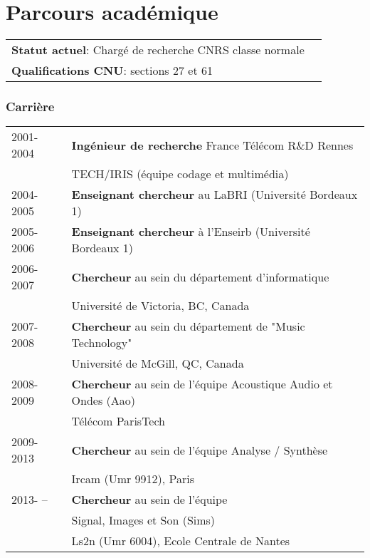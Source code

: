 \chapter{Parcours académique}

\begin{tabular}{lr}
{\bf  Statut actuel}: Chargé de recherche CNRS classe normale  \\
  {\bf Qualifications CNU}:
  sections 27 et 61\\
\end{tabular}

\subsection{Carrière}
\begin{tabular}{ll}
  2001-2004 & {\bf Ingénieur de recherche}  France Télécom R\&D Rennes \\
  & TECH/IRIS (équipe codage et multimédia) \\
  2004-2005 & {\bf Enseignant chercheur} au LaBRI (Université Bordeaux 1) \\
  2005-2006 & {\bf Enseignant chercheur}  à l'Enseirb (Université Bordeaux 1) \\
  2006-2007 & {\bf Chercheur} au sein du département d'informatique \\
  &  Université de Victoria, BC, Canada \\
 2007-2008 &  {\bf Chercheur} au sein du département de  "Music Technology"  \\
  &  Université de McGill, QC, Canada \\
 2008- 2009 &  {\bf Chercheur} au sein de  l'équipe  Acoustique Audio et Ondes (Aao)  \\
  & Télécom ParisTech \\
 2009-2013 &  {\bf Chercheur} au sein de l'équipe Analyse / Synthèse  \\
  & Ircam (Umr 9912), Paris \\
 2013- -- &  {\bf Chercheur} au sein de l'équipe \\
 & Signal, Images et Son (Sims)  \\
  & Ls2n (Umr 6004), Ecole Centrale de Nantes \\

\end{tabular}

